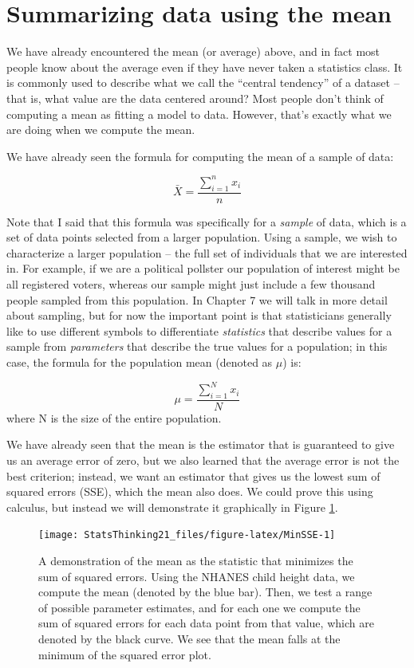 \documentclass[12pt,]{book}
\theoremstyle{definition}
\theoremstyle{definition}
\theoremstyle{definition}
\theoremstyle{remark}
\begin{document}
\hypertarget{summarizing-data-using-the-mean}{%
\section{Summarizing data using the mean}\label{summarizing-data-using-the-mean}}

We have already encountered the mean (or average) above, and in fact most people know about the average even if they have never taken a statistics class. It is commonly used to describe what we call the ``central tendency'' of a dataset -- that is, what value are the data centered around? Most people don't think of computing a mean as fitting a model to data. However, that's exactly what we are doing when we compute the mean.

We have already seen the formula for computing the mean of a sample of data:

\[
\bar{X} = \frac{\sum_{i=1}^{n}x_i}{n}
\]

Note that I said that this formula was specifically for a \emph{sample} of data, which is a set of data points selected from a larger population. Using a sample, we wish to characterize a larger population -- the full set of individuals that we are interested in. For example, if we are a political pollster our population of interest might be all registered voters, whereas our sample might just include a few thousand people sampled from this population. In Chapter 7 we will talk in more detail about sampling, but for now the important point is that statisticians generally like to use different symbols to differentiate \emph{statistics} that describe values for a sample from \emph{parameters} that describe the true values for a population; in this case, the formula for the population mean (denoted as \(\mu\)) is:

\[
\mu = \frac{\sum_{i=1}^{N}x_i}{N}
\]
where N is the size of the entire population.

We have already seen that the mean is the estimator that is guaranteed to give us an average error of zero, but we also learned that the average error is not the best criterion; instead, we want an estimator that gives us the lowest sum of squared errors (SSE), which the mean also does. We could prove this using calculus, but instead we will demonstrate it graphically in Figure \ref{fig:MinSSE}.

\begin{figure}
\texttt{[image: StatsThinking21\_files/figure-latex/MinSSE-1]} \caption{A demonstration of the mean as the statistic that minimizes the sum of squared errors.  Using the NHANES child height data, we compute the mean (denoted by the blue bar). Then, we test a range of possible parameter estimates, and for each one we compute the sum of squared errors for each data point from that value, which are denoted by the black curve.  We see that the mean falls at the minimum of the squared error plot.}\label{fig:MinSSE}
\end{figure}
\end{document}
